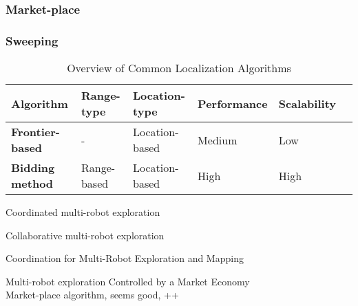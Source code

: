 	\cite{sheng2006distributed}

	\subsubsection{Market-place}
	\cite{zlot2002multi}

	\subsubsection{Sweeping}

\begin{table}[H]
	\renewcommand{\arraystretch}{1.3}
	\caption{Overview of Common Localization Algorithms}
	\label{table_alg_exploration}
	\centering

    \begin{tabular}{|l|l|l|l|l|l|}
	    \hline
	    \bfseries Algorithm & \bfseries Range-type & \bfseries Location-type & \bfseries Performance & \bfseries Scalability\\
	    \hline
	    \bfseries Frontier-based & - & Location-based & Medium & Low\\
	    \hline
	    \bfseries Bidding method & Range-based & Location-based & High & High\\
	    \hline
    \end{tabular}
\end{table}




Coordinated multi-robot exploration
\cite{burgard2005coordinated}

Collaborative multi-robot exploration
\cite{burgard2000collaborative}

Coordination for Multi-Robot Exploration and Mapping
\cite{simmons2000coordination}

Multi-robot exploration Controlled by a Market Economy\\
Market-place algorithm, seems good, ++
\cite{zlot2002multi}

